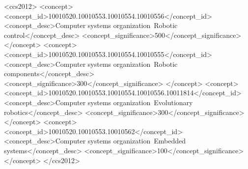 \documentclass[sigconf]{acmart}
\begin{document}
%
%
\begin{CCSXML}
<ccs2012>
<concept>
<concept_id>10010520.10010553.10010554.10010556</concept_id>
<concept_desc>Computer systems organization~Robotic control</concept_desc>
<concept_significance>500</concept_significance>
</concept>
<concept>
<concept_id>10010520.10010553.10010554.10010555</concept_id>
<concept_desc>Computer systems organization~Robotic components</concept_desc>
<concept_significance>300</concept_significance>
</concept>
<concept>
<concept_id>10010520.10010553.10010554.10010556.10011814</concept_id>
<concept_desc>Computer systems organization~Evolutionary robotics</concept_desc>
<concept_significance>300</concept_significance>
</concept>
<concept>
<concept_id>10010520.10010553.10010562</concept_id>
<concept_desc>Computer systems organization~Embedded systems</concept_desc>
<concept_significance>100</concept_significance>
</concept>
</ccs2012>
\end{CCSXML}





\maketitle
\end{document}
